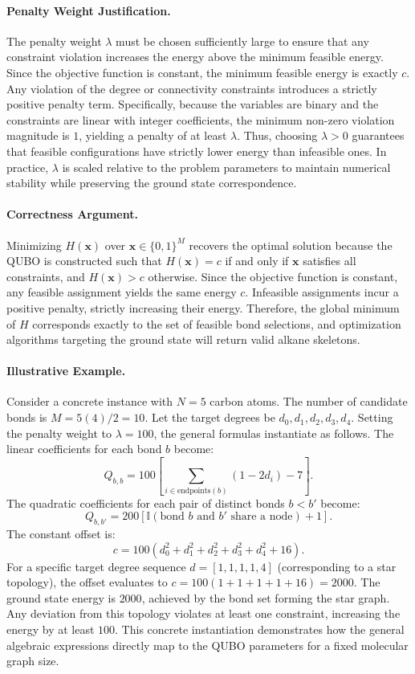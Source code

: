 \documentclass[12pt]{article}
\begin{document}
\paragraph{Penalty Weight Justification.}
The penalty weight $\lambda$ must be chosen sufficiently large to ensure that any constraint violation increases the energy above the minimum feasible energy. Since the objective function is constant, the minimum feasible energy is exactly $c$. Any violation of the degree or connectivity constraints introduces a strictly positive penalty term. Specifically, because the variables are binary and the constraints are linear with integer coefficients, the minimum non-zero violation magnitude is $1$, yielding a penalty of at least $\lambda$. Thus, choosing $\lambda > 0$ guarantees that feasible configurations have strictly lower energy than infeasible ones. In practice, $\lambda$ is scaled relative to the problem parameters to maintain numerical stability while preserving the ground state correspondence.

\paragraph{Correctness Argument.}
Minimizing $H(\mathbf{x})$ over $\mathbf{x} \in \{0,1\}^M$ recovers the optimal solution because the QUBO is constructed such that $H(\mathbf{x}) = c$ if and only if $\mathbf{x}$ satisfies all constraints, and $H(\mathbf{x}) > c$ otherwise. Since the objective function is constant, any feasible assignment yields the same energy $c$. Infeasible assignments incur a positive penalty, strictly increasing their energy. Therefore, the global minimum of $H$ corresponds exactly to the set of feasible bond selections, and optimization algorithms targeting the ground state will return valid alkane skeletons.

\paragraph{Illustrative Example.}
Consider a concrete instance with $N=5$ carbon atoms. The number of candidate bonds is $M = 5(4)/2 = 10$. Let the target degrees be $d_0, d_1, d_2, d_3, d_4$. Setting the penalty weight to $\lambda = 100$, the general formulas instantiate as follows. The linear coefficients for each bond $b$ become:
\[ Q_{b,b} = 100 \left[ \sum_{i \in \text{endpoints}(b)} (1 - 2d_i) - 7 \right]. \]
The quadratic coefficients for each pair of distinct bonds $b < b'$ become:
\[ Q_{b,b'} = 200 \left[ \mathbb{I}(\text{bond } b \text{ and } b' \text{ share a node}) + 1 \right]. \]
The constant offset is:
\[ c = 100 \left( d_0^2 + d_1^2 + d_2^2 + d_3^2 + d_4^2 + 16 \right). \]
For a specific target degree sequence $d = [1, 1, 1, 1, 4]$ (corresponding to a star topology), the offset evaluates to $c = 100(1+1+1+1+16) = 2000$. The ground state energy is $2000$, achieved by the bond set forming the star graph. Any deviation from this topology violates at least one constraint, increasing the energy by at least $100$. This concrete instantiation demonstrates how the general algebraic expressions directly map to the QUBO parameters for a fixed molecular graph size.
\end{document}
